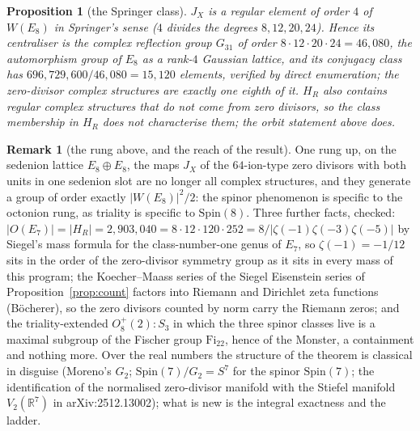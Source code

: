 \documentclass[11pt]{amsart}
\newtheorem{proposition}[theorem]{Proposition}
\theoremstyle{definition}
\newtheorem{remark}[theorem]{Remark}
\begin{document}
\begin{proposition}[the Springer class]\label{prop:springer}
$J_X$ is a regular element of order $4$ of $W(E_8)$ in Springer's sense ($4$ divides the degrees $8,12,20,24$). Hence its centraliser is the complex reflection group $G_{31}$ of order $8\cdot12\cdot20\cdot24=46{,}080$, the automorphism group of $E_8$ as a rank-$4$ Gaussian lattice, and its conjugacy class has $696{,}729{,}600/46{,}080=15{,}120$ elements, verified by direct enumeration; the zero-divisor complex structures are exactly one eighth of it. $H_R$ also contains regular complex structures that do not come from zero divisors, so the class membership in $H_R$ does not characterise them; the orbit statement above does.
\end{proposition}
\begin{remark}[the rung above, and the reach of the result]
One rung up, on the sedenion lattice $E_8\oplus E_8$, the maps $J_X$ of the $64$-ion-type zero divisors with both units in one sedenion slot are no longer all complex structures, and they generate a group of order exactly $|W(E_8)|^2/2$: the spinor phenomenon is specific to the octonion rung, as triality is specific to $\mathrm{Spin}(8)$. Three further facts, checked: $|O(E_7)|=|H_R|=2{,}903{,}040=8\cdot12\cdot120\cdot252=8/|\zeta(-1)\zeta(-3)\zeta(-5)|$ by Siegel's mass formula for the class-number-one genus of $E_7$, so $\zeta(-1)=-1/12$ sits in the order of the zero-divisor symmetry group as it sits in every mass of this program; the Koecher--Maass series of the Siegel Eisenstein series of Proposition~\ref{prop:count} factors into Riemann and Dirichlet zeta functions (B\"ocherer), so the zero divisors counted by norm carry the Riemann zeros; and the triality-extended $O_8^+(2){:}S_3$ in which the three spinor classes live is a maximal subgroup of the Fischer group $\mathrm{Fi}_{22}$, hence of the Monster, a containment and nothing more. Over the real numbers the structure of the theorem is classical in disguise (Moreno's $G_2$; $\mathrm{Spin}(7)/G_2=S^7$ for the spinor $\mathrm{Spin}(7)$; the identification of the normalised zero-divisor manifold with the Stiefel manifold $V_2(\mathbb R^7)$ in arXiv:2512.13002); what is new is the integral exactness and the ladder.
\end{remark}
\end{document}
